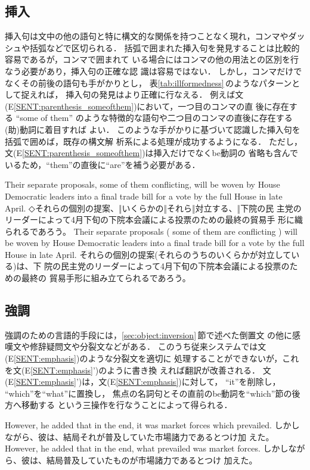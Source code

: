 \subsection{挿入}
\label{sec:object:parenthesis}

挿入句は文中の他の語句と特に構文的な関係を持つことなく現れ，コンマやダッ
シュや括弧などで区切られる．
括弧で囲まれた挿入句を発見することは比較的容易であるが，コンマで囲まれて
いる場合にはコンマの他の用法との区別を行なう必要があり，挿入句の正確な認
識は容易ではない\cite{TakedaNoriko95}．
しかし，コンマだけでなくその前後の語句も手がかりとし，
表\ref{tab:illformedness}\,のようなパターンとして捉えれば，
挿入句の発見はより正確に行なえる．
例えば文(E\ref{SENT:parenthesis_someofthem})において，一つ目のコンマの直
後に存在する
``some of them''
のような特徴的な語句や二つ目のコンマの直後に存在する(助)動詞に着目すれば
よい．
このような手がかりに基づいて認識した挿入句を括弧で囲めば，既存の構文解
析系による処理が成功するようになる．
ただし，文(E\ref{SENT:parenthesis_someofthem})は挿入だけでなくbe動詞の
省略も含んでいるため，``them''の直後に``are''を補う必要がある．
\begin{SENT}
\sentE Their separate proposals, some of them conflicting, will be woven
by House Democratic leaders into a final trade bill for a vote by the 
full House in late April.
\sentJ ◇それらの個別の提案、‖いくらかの‖それら‖対立する、‖下院の民
主党のリーダーによって4月下旬の下院本会議による投票のための最終の貿易手
形に織られるであろう。
\sentNewE Their separate proposals ( some of them are conflicting )
 will be woven by House Democratic leaders into a final trade bill for 
a vote by the full House in late April.
\sentNewJ それらの個別の提案(それらのうちのいくらかが対立している)は、下
院の民主党のリーダーによって4月下旬の下院本会議による投票のための最終の
貿易手形に組み立てられるであろう。
\label{SENT:parenthesis_someofthem}
\end{SENT}

\subsection{強調}
\label{sec:object:emphasis}

強調のための言語的手段には，\ref{sec:object:inversion}\,節で述べた倒置文
の他に感嘆文や修辞疑問文や分裂文などがある．
このうち従来システムでは文(E\ref{SENT:emphasis})のような分裂文を適切に
処理することができないが，これを文(E\ref{SENT:emphasis}')のように書き換
えれば翻訳が改善される．
文(E\ref{SENT:emphasis}')は，文(E\ref{SENT:emphasis})に対して，
``it''を削除し，
``which''を``what''に置換し，
焦点の名詞句とその直前のbe動詞を``which''節の後方へ移動する
という三操作を行なうことによって得られる．
\begin{SENT}
\sentE However, he added that in the end, it was market forces which 
prevailed.
\sentJ しかしながら、彼は、結局それが普及していた市場諸力であるとつけ加
えた。
\sentNewE However, he added that in the end, what prevailed was market 
forces. 
\sentNewJ しかしながら、彼は、結局普及していたものが市場諸力であるとつけ
加えた。
\label{SENT:emphasis}
\end{SENT}

